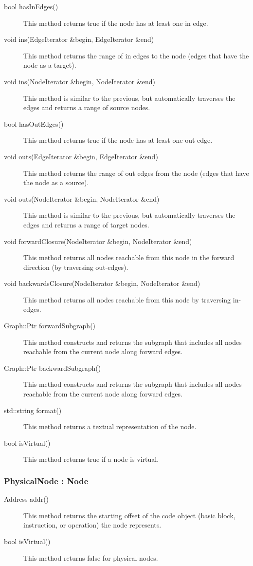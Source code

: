 \documentclass[12pt,titlepage]{article}
\begin{document}
\begin{description}
\item[bool hasInEdges()] This method returns true if the node has at
  least one in edge. 
\item[void ins(EdgeIterator \&begin, EdgeIterator \&end)]
This method returns the range of in edges to the node (edges that have the node as a target). 
\item[void ins(NodeIterator \&begin, NodeIterator \&end)]
This method is similar to the previous, but automatically traverses the edges and returns a range of source nodes. 
\item[bool hasOutEdges()] This method returns true if the node has at
  least one out edge. 
\item[void outs(EdgeIterator \&begin, EdgeIterator \&end)]
This method returns the range of out edges from the node (edges that have the node as a source). 
\item[void outs(NodeIterator \&begin, NodeIterator \&end)]
This method is similar to the previous, but automatically traverses the edges and returns a range of target nodes.
\item[void forwardClosure(NodeIterator \&begin, NodeIterator \&end)]
This method returns all nodes reachable from this node in the forward direction (by traversing out-edges).
\item[void backwardsClosure(NodeIterator \&begin, NodeIterator \&end)]
This method returns all nodes reachable from this node by traversing in-edges.
\item[Graph::Ptr forwardSubgraph()]
This method constructs and returns the subgraph that includes all
nodes reachable from the current node along forward edges.
\item[Graph::Ptr backwardSubgraph()]
This method constructs and returns the subgraph that includes all
nodes reachable from the current node along forward edges.
\item[std::string format()]
This method returns a textual representation of the node.
\item[bool isVirtual() ]
This method returns true if a node is virtual.
\end{description}

\subsubsection{PhysicalNode : Node}
\begin{description}
\item[Address addr()] This method returns the starting
offset of the code object (basic block, instruction, or operation) the
node represents.
\item[bool isVirtual()] This method returns false for physical nodes.
\end{description}
\end{document}
